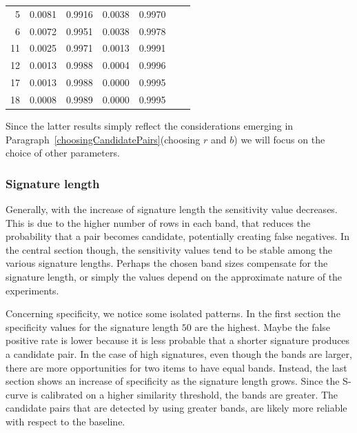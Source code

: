 \begin{table}
\begin{tabular}{rcccccc}
        5  & \cellcolor{violet}0.0081  & \cellcolor{violet}0.9916  & 0.0038 & 0.9970 \\  
        6  & \cellcolor{violet}0.0072  & \cellcolor{violet}0.9951  & 0.0038 & 0.9978 \\          
        11 & \cellcolor{violet}0.0025  & \cellcolor{violet}0.9971  & 0.0013 & 0.9991 \\  
        12 & \cellcolor{violet}0.0013  & \cellcolor{violet}0.9988  & 0.0004 & 0.9996 \\          
        17 & \cellcolor{violet}0.0013  & \cellcolor{violet}0.9988  & 0.0000 & 0.9995 \\   
        18 & \cellcolor{violet}0.0008  & \cellcolor{violet}0.9989  & 0.0000 & 0.9995 \\ 
         
        \bottomrule
    \end{tabular}
    \label{tab:quality}
\end{table}
 
Since the latter results simply reflect the considerations emerging in Paragraph~\ref{choosingCandidatePairs}(choosing $r$ and $b$) we will focus on the choice of other parameters. 

\subsubsection{Signature length}
Generally, with the increase of signature length the sensitivity value decreases. This is due to the higher number of rows in each band, that reduces the probability that a pair becomes candidate, potentially creating false negatives. In the central section though, the sensitivity values tend to be stable among the various signature lengths. Perhaps the chosen band sizes compensate for the signature length, or simply the values depend on the approximate nature of the experiments. 

Concerning specificity, we notice some isolated patterns. In the first section the specificity values for the signature length $50$ are the highest. Maybe the false positive rate is lower because it is less probable that a shorter signature produces a candidate pair. In the case of high signatures, even though the bands are larger, there are more opportunities for two items to have equal bands. Instead, the last section shows an increase of specificity as the signature length grows. Since the S-curve is calibrated on a higher similarity threshold, the bands are greater. The candidate pairs that are detected by using greater bands, are likely more reliable with respect to the baseline.

